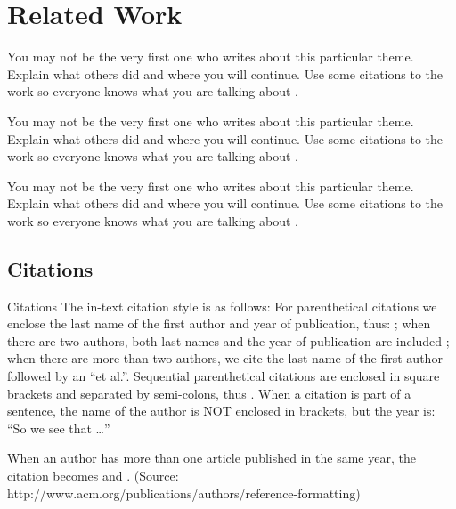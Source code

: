 
\chapter{Related Work}
\label{sec:related}
You may not be the very first one who writes about this particular theme. Explain what others did and where you will continue.
Use some citations to the work so everyone knows what you are talking about \citep{knuth:1976}.

You may not be the very first one who writes about this particular theme. Explain what others did and where you will continue.
Use some citations to the work so everyone knows what you are talking about \citep{knuth:1976}.

You may not be the very first one who writes about this particular theme. Explain what others did and where you will continue.
Use some citations to the work so everyone knows what you are talking about \citep{knuth:1976}.

\section{Citations}{Citations}
The in-text citation style is as follows: For parenthetical citations we enclose the last name of the first author and year of publication, thus: \citep{knuth:1976}; when there are two authors, both last names and the year of publication are included \citep*{test:2001}; when there are more than two authors, we cite the last name of the first author followed by an ``et al.''\citep{cormen:2001}. Sequential parenthetical citations are enclosed in square brackets and separated by semi-colons, thus \citep{knuth:1976,test:2001}. When a citation is part of a sentence, the name of the author is NOT enclosed in brackets, but the year is: ``So we see that \citet{knuth:1976} \dots''

When an author has more than one article published in the same year, the citation becomes \citep{test:2001} and \citep{test2:2001}. (Source: http://www.acm.org/publications/authors/reference-formatting)